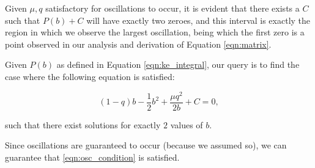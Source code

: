 \documentclass{article}
\begin{document}
Given $\mu, q$ satisfactory for oscillations to occur,
it is evident that there exists a $C$ such that $P(b)+C$ will have exactly two zeroes,
and this interval is exactly the region in which we observe the largest oscillation,
being which the first zero is a point observed in our analysis and derivation of Equation \ref{eqn:matrix}.

Given $P(b)$ as defined in Equation \ref{eqn:ke_integral},
our query is to find the case where the following equation is satisfied:

\begin{equation}
    (1-q)b - \frac{1}{2}b^2 + \frac{\mu q^2}{2b} + C = 0,
\end{equation}

such that there exist solutions for exactly $2$ values of $b$.

Since oscillations are guaranteed to occur (because we assumed so),
we can guarantee that \ref{eqn:osc_condition} is satisfied.











\end{document}
